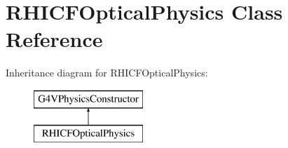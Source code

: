 \hypertarget{class_r_h_i_c_f_optical_physics}{}\section{R\+H\+I\+C\+F\+Optical\+Physics Class Reference}
\label{class_r_h_i_c_f_optical_physics}
Inheritance diagram for R\+H\+I\+C\+F\+Optical\+Physics\+:\begin{figure}[H]
\begin{center}
\leavevmode
\includegraphics[height=2.000000cm]{class_r_h_i_c_f_optical_physics}
\end{center}
\end{figure}
